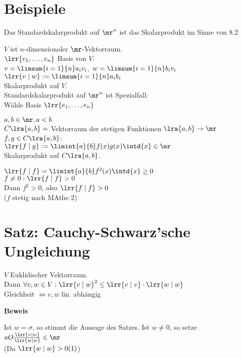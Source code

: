 \section{Beispiele}
		\item Das Standardskalarprodukt auf $\mr^n$ ist das Skalarprodukt im Sinne von 8.2
		\item $V$ ist $n$-dimensionaler $\mr$-Vektorraum.\\
			$\lrr{v_1,\dots,v_n}$ Basis von $V$.\\
			$v=\limsum{i=1}{n}a_iv_i$, $w=\limsum{i=1}{n}b_iv_i$\\
			$\lrr{v\mid w}:=\limsum{i=1}{n}a_ib_i$\\
			Skalarprodukt auf $V$.\\
			Standardskalarprodukt auf $\mr^n$ ist Spezialfall:\\
			Wähle Basis $\lrr{e_1,\dots,e_n}$
		\item $a,b\in\mr, a<b$\\
			$C\lra{a,b}=$ Vektorraum der stetigen Funktionen $\lra{a,b}\rightarrow\mr$\\
			$f,g\in C\lra{a,b}$:\\
			$\lrr{f\mid g}:=\limint{a}{b}f(x)g(x)\intd{x}\in\mr$\\
			Skalarprodukt auf $C\lra{a,b}$.\\
				\item $\lrr{f\mid f}=\limint{a}{b}f^2(x)\intd{x}\geq 0$\\
					$f\neq 0: \lrr{f\mid f}>0$\\
					Dann $f^2>0$, also $\lrr{f\mid f}> 0$\\
					($f$ stetig nach MAthe 2)
			\subExEnd
	\subExEnd

\section{Satz: Cauchy-Schwarz'sche Ungleichung}
	$V$ Euklidischer Vektorraum.\\
	Dann $\forall v,w\in V: \lrr{v\mid w}^2\leq\lrr{v\mid v}\cdot\lrr{w\mid w}$\\
	Gleichheit $\Leftrightarrow v,w$ lin. abhängig

	\textbf{Beweis}

	Ist $w=\sigma$, so stimmt die Aussage des Satzes. Ist $w\neq 0$, so setze $aO\frac{\lrr{v\mid w}}{\lrr{w\mid w}}\in\mr$\\
	(Da $\lrr{w\mid w}> 0 (1)$)

